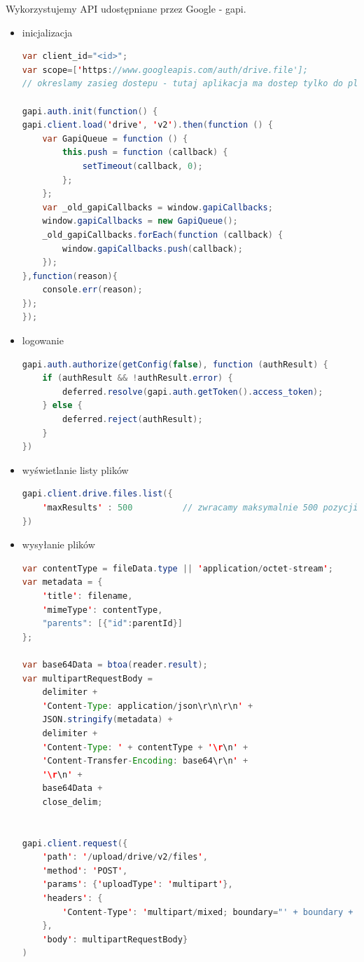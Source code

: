 \documentclass{report}
\begin{document}
		Wykorzystujemy API udostępniane przez Google - gapi.
		\begin{itemize}
		\item inicjalizacja
		\begin{lstlisting}[language=Java, breaklines]
var client_id="<id>";
var scope=['https://www.googleapis.com/auth/drive.file']; 
// okreslamy zasieg dostepu - tutaj aplikacja ma dostep tylko do plikow na Google Drive

gapi.auth.init(function() {
gapi.client.load('drive', 'v2').then(function () {
	var GapiQueue = function () {
		this.push = function (callback) {
			setTimeout(callback, 0);
		};
	};
	var _old_gapiCallbacks = window.gapiCallbacks;
	window.gapiCallbacks = new GapiQueue();
	_old_gapiCallbacks.forEach(function (callback) {
		window.gapiCallbacks.push(callback);
	});
},function(reason){
	console.err(reason);
});
});        	
		\end{lstlisting}
		\item logowanie
		\begin{lstlisting}[language=Java, breaklines]
gapi.auth.authorize(getConfig(false), function (authResult) {
	if (authResult && !authResult.error) {
		deferred.resolve(gapi.auth.getToken().access_token);
	} else {
		deferred.reject(authResult);
	}
})
		\end{lstlisting}
		\item wyświetlanie listy plików
		\begin{lstlisting}[language=Java, breaklines]
gapi.client.drive.files.list({
	'maxResults' : 500 			// zwracamy maksymalnie 500 pozycji
})
		\end{lstlisting}
		\item wysyłanie plików
		\begin{lstlisting}[language=Java, breaklines]
var contentType = fileData.type || 'application/octet-stream';
var metadata = {
	'title': filename,
	'mimeType': contentType,
	"parents": [{"id":parentId}]
};

var base64Data = btoa(reader.result);
var multipartRequestBody =
	delimiter +
	'Content-Type: application/json\r\n\r\n' +
	JSON.stringify(metadata) +
	delimiter +
	'Content-Type: ' + contentType + '\r\n' +
	'Content-Transfer-Encoding: base64\r\n' +
	'\r\n' +
	base64Data +
	close_delim;
	
	
gapi.client.request({
	'path': '/upload/drive/v2/files',
	'method': 'POST',
	'params': {'uploadType': 'multipart'},
	'headers': {
		'Content-Type': 'multipart/mixed; boundary="' + boundary + '"'
	},
	'body': multipartRequestBody}
)
		\end{lstlisting}
		\end{itemize}
	
\end{document}

